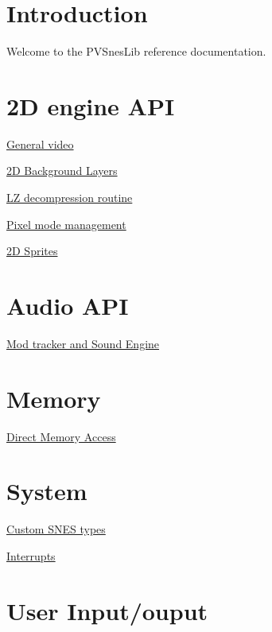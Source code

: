 \hypertarget{index_intro}{}\section{Introduction}\label{index_intro}
Welcome to the P\+V\+Snes\+Lib reference documentation.\hypertarget{index_video_2D_api}{}\section{2\+D engine A\+PI}\label{index_video_2D_api}

\begin{DoxyItemize}
\item \hyperlink{a00368}{General video}
\item \hyperlink{a00332}{2D Background Layers}
\item \hyperlink{a00347}{LZ decompression routine}
\item \hyperlink{a00353}{Pixel mode management}
\item \hyperlink{a00365}{2D Sprites}
\end{DoxyItemize}\hypertarget{index_audio_api}{}\section{Audio A\+PI}\label{index_audio_api}

\begin{DoxyItemize}
\item \hyperlink{a00362}{Mod tracker and Sound Engine}
\end{DoxyItemize}\hypertarget{index_memory_api}{}\section{Memory}\label{index_memory_api}

\begin{DoxyItemize}
\item \hyperlink{a00338}{Direct Memory Access}
\end{DoxyItemize}\hypertarget{index_system_api}{}\section{System}\label{index_system_api}

\begin{DoxyItemize}
\item \hyperlink{a00359}{Custom S\+N\+ES types}
\item \hyperlink{a00341}{Interrupts}
\end{DoxyItemize}\hypertarget{index_user_io_api}{}\section{User Input/ouput}\label{index_user_io_api}

